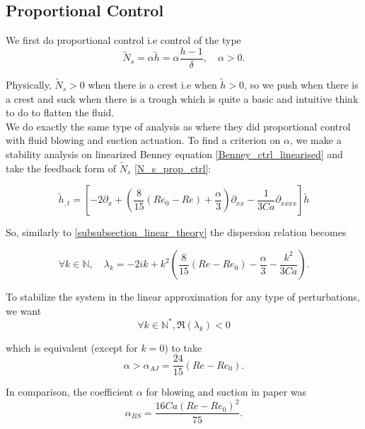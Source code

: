 \documentclass[12pt]{article}
\begin{document}
 
\subsubsection{}


\subsection{Proportional Control}
We first do proportional control i.e control of the type 
\begin{equation}\label{N_s_prop_ctrl}
    \tilde{N}_s = \alpha\tilde{h} = \alpha \frac{h-1}{\delta}, \quad \alpha >0.
\end{equation}

Physically, $\tilde{N}_s >0$ when there is a crest i.e when $\tilde{h}>0$, so we push when there is a crest and suck when there is a trough which is quite a basic and intuitive think to do to flatten the fluid. 
\\

 We do exactly the same type of analysis as \cite{Thompson_2016_prop_ctrl} where they did proportional control with fluid blowing and suction actuation. To find a criterion on $\alpha$, we make a stability analysis on linearized Benney equation \eqref{Benney_ctrl_linearised} and take the feedback form of $\tilde{N}_s$ \eqref{N_s_prop_ctrl}:  

\begin{equation}
\tilde{h}_{,t} = \left[ -2\partial_x + \left( \frac{8}{15}(Re_0-Re)+\frac{\alpha}{3}\right)\partial_{xx} - \frac{1}{3Ca}\partial_{xxxx}\right]\tilde{h} 
\end{equation}

So, similarly to \eqref{subsubsection_linear_theory} the dispersion relation becomes

\begin{equation}\label{eq_dispertion_prop_ctrl}
    \forall k\in \mathbb{N},\quad \lambda_k = -2ik+ k^2\left(\frac{8}{15}(Re-Re_0)-\frac{\alpha}{3}-\frac{k^2}{3Ca}\right).
\end{equation}

To stabilize the system in the linear approximation for any type of perturbations, we want $$\forall k \in \mathbb{N}^*, \mathfrak{R}(\lambda_k) <0$$

which is equivalent (except for $k=0$) to take 
\begin{equation}
    \alpha > \alpha_{AJ}= \frac{24}{15}(Re-Re_0).
\end{equation}


In comparison, the coefficient $\alpha$ for blowing and suction in paper \cite{Thompson_2016_prop_ctrl} was 
\begin{equation}
    \alpha_{BS} = \frac{16Ca(Re-Re_0)^2}{75}.
\end{equation}
\end{document}
